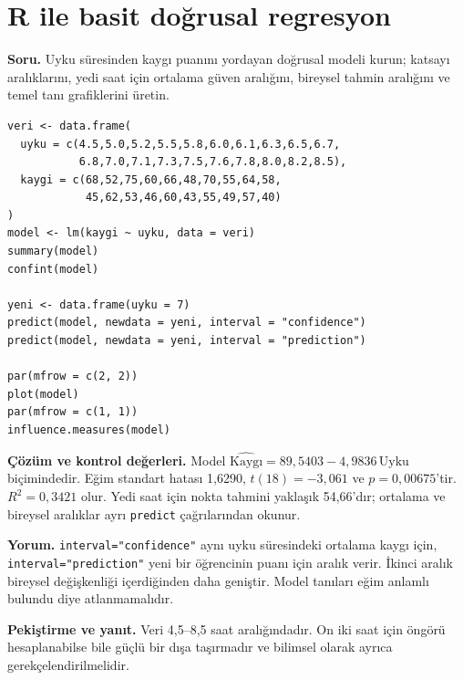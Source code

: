\section{R ile basit doğrusal regresyon}
\label{sec:r-regression}

\textbf{Soru.} Uyku süresinden kaygı puanını yordayan doğrusal modeli kurun;
katsayı aralıklarını, yedi saat için ortalama güven aralığını, bireysel tahmin
aralığını ve temel tanı grafiklerini üretin.

\begin{lstlisting}[style=prismR]
veri <- data.frame(
  uyku = c(4.5,5.0,5.2,5.5,5.8,6.0,6.1,6.3,6.5,6.7,
           6.8,7.0,7.1,7.3,7.5,7.6,7.8,8.0,8.2,8.5),
  kaygi = c(68,52,75,60,66,48,70,55,64,58,
            45,62,53,46,60,43,55,49,57,40)
)
model <- lm(kaygi ~ uyku, data = veri)
summary(model)
confint(model)

yeni <- data.frame(uyku = 7)
predict(model, newdata = yeni, interval = "confidence")
predict(model, newdata = yeni, interval = "prediction")

par(mfrow = c(2, 2))
plot(model)
par(mfrow = c(1, 1))
influence.measures(model)
\end{lstlisting}

\begin{outputguidebox}
\textbf{Çözüm ve kontrol değerleri.} Model
$\widehat{\text{Kaygı}}=89{,}5403-4{,}9836\,\text{Uyku}$ biçimindedir.
Eğim standart hatası 1,6290, $t(18)=-3{,}061$ ve $p=0{,}00675$'tir.
$R^2=0{,}3421$ olur. Yedi saat için nokta tahmini yaklaşık 54,66'dır;
ortalama ve bireysel aralıklar ayrı \texttt{predict} çağrılarından okunur.
\end{outputguidebox}

\textbf{Yorum.} 
\texttt{interval="confidence"} aynı uyku süresindeki ortalama kaygı için,
\texttt{interval="prediction"} yeni bir öğrencinin puanı için aralık verir.
İkinci aralık bireysel değişkenliği içerdiğinden daha geniştir. Model tanıları
eğim anlamlı bulundu diye atlanmamalıdır.

\textbf{Pekiştirme ve yanıt.} Veri 4,5--8,5 saat aralığındadır. On iki saat
için öngörü hesaplanabilse bile güçlü bir dışa taşırmadır ve bilimsel olarak
ayrıca gerekçelendirilmelidir.